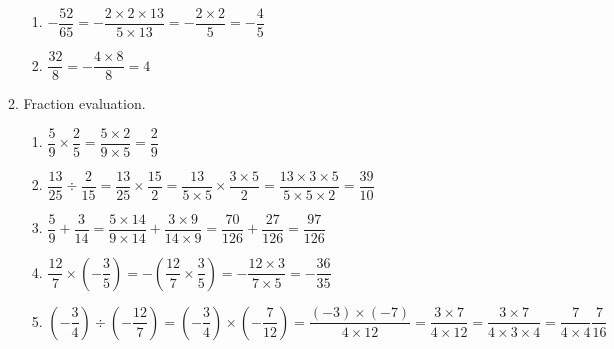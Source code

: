 \documentclass[fleqn]{article}
\begin{document}
\begin{enumerate}[label=\textbf{\arabic*.},labelsep=2em]
\begin{enumerate}[label=\textbf{\arabic*.},labelsep=2em]
\begin{enumerate}[label=\textbf{(\alph*)},labelsep=2em]
\item $ -\dfrac{52}{65} = -\dfrac{2 \times 2 \times 13}{5 \times 13} = -\dfrac{2 \times 2}{5} = -\dfrac{4}{5} $

\item $ \dfrac{32}{8} = -\dfrac{4 \times 8}{8} = 4 $

\end{enumerate}

\item
Fraction evaluation.

\begin{enumerate}[label=\textbf{(\alph*)},labelsep=2em]

\item 
$ 
	\dfrac{5}{9} \times \dfrac{2}{5} = 
	\dfrac{5 \times 2}{ 9 \times 5} = 
	\dfrac{2}{9}
$

\item 
$ 
	\dfrac{13}{25} \div \dfrac{2}{15} = 
	\dfrac{13}{25} \times \dfrac{15}{2} =
	\dfrac{13}{5 \times 5} \times \dfrac{3 \times 5}{2} = 
	\dfrac{13 \times 3 \times 5}{5 \times 5 \times 2} = 
	\dfrac{39}{10}
$

\item
$
	\dfrac{5}{9} + \dfrac{3}{14} =
	\dfrac{5 \times 14}{9 \times 14} + \dfrac{3 \times 9}{14 \times 9} =
	\dfrac{70}{126} + \dfrac{27}{126} =
	\dfrac{97}{126}
$

\item
$
	\dfrac{12}{7} \times \left( - \dfrac{3}{5} \right) =
	- \left( \dfrac{12}{7} \times \dfrac{3}{5} \right) =
	- \dfrac{12 \times 3}{7 \times 5} =
	- \dfrac{36}{35}
$

\item
$
	\left( -\dfrac{3}{4} \right) \div \left( -\dfrac{12}{7} \right) =
	\left( -\dfrac{3}{4} \right) \times \left( -\dfrac{7}{12} \right) =
	\dfrac {(-3) \times (-7)}{4 \times 12} =
	\dfrac {3 \times 7}{4 \times 12} =
	\dfrac{3 \times 7}{4 \times 3 \times 4} = 
	\dfrac{7}{4 \times 4}
	\dfrac{7}{16}
$

\end{enumerate}

\end{enumerate} %

\end{enumerate}
\end{document}
